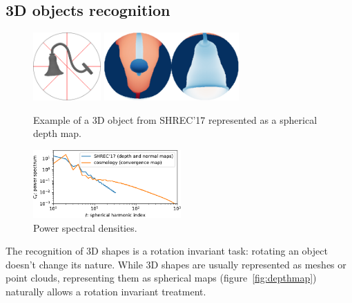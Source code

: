 \documentclass{article} %
\newcommand{\todo}[1]{{\color[rgb]{.6,.1,.6}{#1}}}
\newcommand{\figref}[1]{figure~\ref{fig:#1}}
\begin{document}
\subsection{3D objects recognition} \label{sec:exp:objects}

\begin{figure}
	\begin{minipage}[t]{0.57\linewidth}
		\centering
		\includegraphics[height=7em]{lamp_000018}
		\hfill
		\includegraphics[height=7em]{lamp_000018_sphere_nobar}
		\caption{Example of a 3D object from SHREC'17 represented as a spherical depth map.}
		\label{fig:depthmap}
	\end{minipage}
	\hfill
	\begin{minipage}[t]{0.35\linewidth}
		\centering
		\includegraphics[height=7em]{spectrum}
		\caption{Power spectral densities.}
		\label{fig:spectrum}
	\end{minipage}
\end{figure}

The recognition of 3D shapes is a rotation invariant task: rotating an object doesn't change its nature.
While 3D shapes are usually represented as meshes or point clouds, representing them as spherical maps (\figref{depthmap}) naturally allows a rotation invariant treatment.
\end{document}
